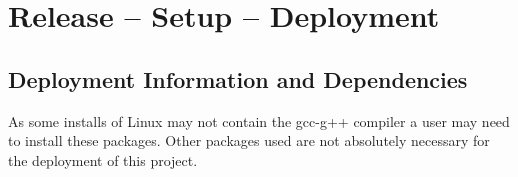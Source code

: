 
\chapter{Release -- Setup -- Deployment}

\section{Deployment Information and Dependencies}
As some installs of Linux may not contain the gcc-g++ compiler a user may need to install these packages. Other packages used are not absolutely necessary for the deployment of this project. 



